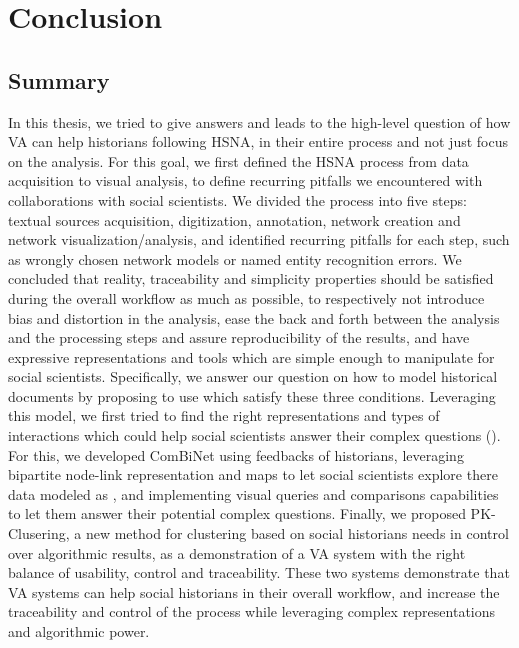 \chapter{Conclusion}




\section{Summary}

In this thesis, we tried to give answers and leads to the high-level question of how VA can help historians following HSNA, in their entire process and not just focus on the analysis.
For this goal, we first defined the HSNA process from data acquisition to visual analysis, to define recurring pitfalls we encountered with collaborations with social scientists.
We divided the process into five steps: textual sources acquisition, digitization, annotation, network creation and network visualization/analysis, and identified recurring pitfalls for each step, such as wrongly chosen network models or named entity recognition errors.
We concluded that reality, traceability and simplicity properties should be satisfied during the overall workflow as much as possible, to respectively not introduce bias and distortion in the analysis, ease the back and forth between the analysis and the processing steps and assure reproducibility of the results, and have expressive representations and tools which are simple enough to manipulate for social scientists.
Specifically, we answer our question \qone on how to model historical documents by proposing to use \modelPlural which satisfy these three conditions.
Leveraging this model, we first tried to find the right representations and types of interactions which could help social scientists answer their complex questions (\qtwo).
For this, we developed ComBiNet using feedbacks of historians, leveraging bipartite node-link representation and maps to let social scientists explore there data modeled as \modelPlural, and implementing visual queries and comparisons capabilities to let them answer their potential complex questions.
Finally, we proposed PK-Clusering, a new method for clustering based on social historians needs in control over algorithmic results, as a demonstration of a VA system with the right balance of usability, control and traceability.
These two systems demonstrate that VA systems can help social historians in their overall workflow, and increase the traceability and control of the process while leveraging complex representations and algorithmic power.



